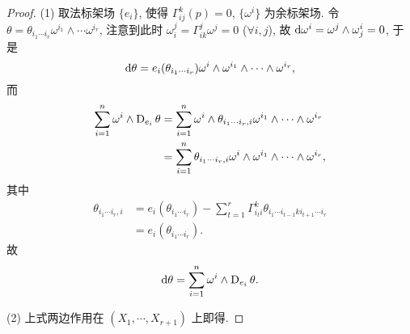 \begin{proof}
  (1) 取法标架场 $\{e_i\}$, 使得 $\Gamma_{ij}^k(p)=0$, $\{\omega^i\}$ 为余标架场.
  令 $\theta=\theta_{i_1\cdots i_r}\omega^{i_1}\wedge\cdots\omega^{i_r}$, 
  注意到此时 $\omega_i^j=\Gamma_{ik}^j\omega^j=0$ ($\forall i,j$), 故 $\mathop{}\!\mathrm{d}\omega^i=\omega^j\wedge\omega_j^i=0$, 于是
  \[\mathop{}\!\mathrm{d}\theta = e_i(\theta_{i_1\cdots i_r})\omega^{i}\wedge\omega^{i_1}\wedge\cdots
    \wedge\omega^{i_r},\]
  而
  \begin{align*}
    \sum_{i=1}^n \omega^i\wedge\operatorname{D}_{e_i}\theta
    & = \sum_{i=1}^n \omega^i\wedge\theta_{i_1\cdots i_r,i}\omega^{i_1}\wedge\cdots\wedge\omega^{i_r} \\
    & = \sum_{i=1}^n \theta_{i_1\cdots i_r,i} \omega^i\wedge\omega^{i_1}\wedge\cdots\wedge\omega^{i_r},
  \end{align*}
  其中
  \begin{align*}
    \theta_{i_1\cdots i_r,i}
    & = e_i(\theta_{i_1\cdots i_r}) 
      - \sum_{t=1}^r \Gamma_{i_t i}^k \theta_{i_1\cdots i_{t-1}ki_{t+1}\cdots i_r} \\
    & = e_i(\theta_{i_1\cdots i_r}).
  \end{align*}
  故
  \[\mathop{}\!\mathrm{d}\theta = \sum_{i=1}^n \omega^i\wedge\operatorname{D}_{e_i}\theta.\]

  (2) 上式两边作用在 $(X_1,\cdots,X_{r+1})$ 上即得.
\end{proof}